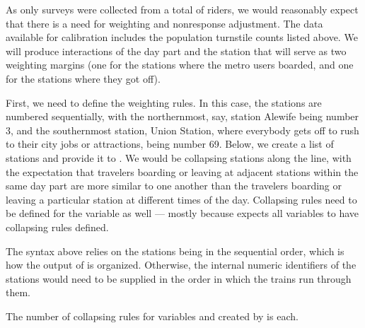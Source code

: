 

\noindent
\begin{stlog}
\nullskip
\end{stlog}


As only \nullskip surveys were collected from a total of
\nullskip riders, we would reasonably expect that there is a need
for weighting and nonresponse adjustment. 
The data available for calibration includes the population turnstile counts
listed above. We will produce interactions of the day part and the station that will serve as two
weighting margins (one for the stations where the metro users boarded, and one for the stations
where they got off).

First, we need to define the weighting rules. In this case, the stations are numbered sequentially,
with the northernmost, say, station Alewife being number 3, and the southernmost station,
Union Station, where everybody gets off to rush to their city jobs or attractions, being number 69.
Below, we create a list of stations and provide it to .
We would be collapsing stations along the line, with the expectation that travelers boarding or leaving
at adjacent stations within the same day part are more similar to one another than the travelers
boarding or leaving a particular station at different times of the day. Collapsing rules
need to be defined for the  variable as well --- mostly because 
expects all variables to have collapsing rules defined.

\begin{stlog}
\nullskip
\end{stlog}

The syntax above relies on the stations being in the sequential order, which is how 
the output of  is organized. Otherwise, the internal numeric identifiers of the stations
would need to be supplied in the order in which the trains run through them.

The number of collapsing rules for variables  and 
created by 
is \nullskip each.


